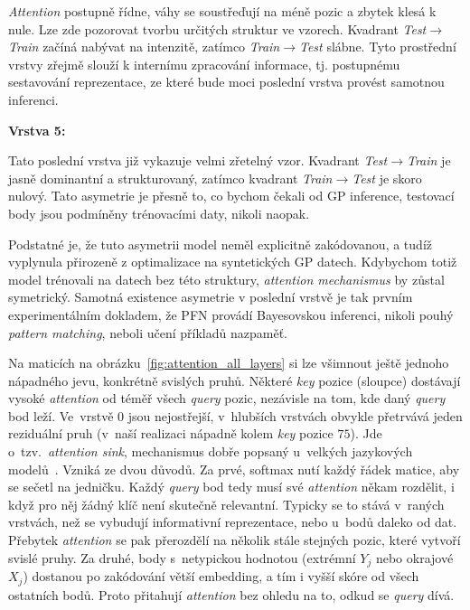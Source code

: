 \emph{Attention} postupně řídne, váhy se soustřeďují na méně pozic a zbytek klesá k nule.
Lze zde pozorovat tvorbu určitých struktur ve vzorech.
Kvadrant \textit{Test$\to$Train} začíná nabývat na intenzitě, zatímco \textit{Train$\to$Test} slábne.
Tyto prostřední vrstvy zřejmě slouží k internímu zpracování informace, tj. postupnému sestavování reprezentace, ze které bude moci poslední vrstva provést samotnou inferenci.

\textbf{Vrstva 5:}
 
Tato poslední vrstva již vykazuje velmi zřetelný vzor.
Kvadrant \textit{Test$\to$Train} je jasně dominantní a strukturovaný, zatímco kvadrant \textit{Train$\to$Test} je skoro nulový.
Tato asymetrie je přesně to, co bychom čekali od GP inference, testovací body jsou podmíněny trénovacími daty, nikoli naopak.
\par

Podstatné je, že tuto asymetrii model neměl explicitně zakódovanou, a tudíž vyplynula přirozeně z optimalizace na syntetických GP datech.
Kdybychom totiž model trénovali na datech bez této struktury, \emph{attention mechanismus} by zůstal symetrický.
Samotná existence asymetrie v poslední vrstvě je tak prvním experimentálním dokladem, že PFN provádí Bayesovskou inferenci, nikoli pouhý \emph{pattern matching}, neboli učení příkladů nazpaměť.
\par

Na maticích na obrázku~\ref{fig:attention_all_layers} si lze všimnout ještě jednoho nápadného jevu, konkrétně svislých pruhů.
Některé \textit{key} pozice (sloupce) dostávají vysoké \emph{attention} od téměř všech \emph{query} pozic, nezávisle na tom, kde daný \emph{query} bod leží.
Ve~vrstvě $0$ jsou nejostřejší, v~hlubších vrstvách obvykle přetrvává jeden reziduální pruh (v~naší realizaci nápadně kolem \textit{key} pozice $75$).
Jde o~tzv.\ \textit{attention sink}, mechanismus dobře popsaný u~velkých jazykových modelů~\cite{xiao2024}.
Vzniká ze dvou důvodů.
Za prvé, softmax nutí každý řádek matice, aby se sečetl na jedničku.
Každý \textit{query} bod tedy musí své \emph{attention} někam rozdělit, i když pro něj žádný klíč není skutečně relevantní.
Typicky se to stává v~raných vrstvách, než se vybudují informativní reprezentace, nebo u~bodů daleko od dat.
Přebytek \emph{attention} se pak přerozdělí na několik stále stejných pozic, které vytvoří svislé pruhy.
Za druhé, body s~netypickou hodnotou (extrémní $Y_j$ nebo okrajové $X_j$) dostanou po zakódování větší embedding, a tím i vyšší skóre od všech ostatních bodů.
Proto přitahují \emph{attention} bez ohledu na to, odkud se \textit{query} dívá.
\par


